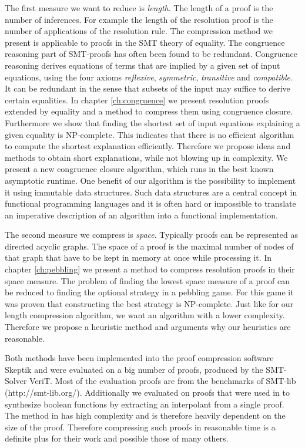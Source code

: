 The first measure we want to reduce is \emph{length}.
The length of a proof is the number of inferences.
For example the length of the resolution proof is the number of applications of the resolution rule.
The compression method we present is applicable to proofs in the SMT theory of equality.
The congruence reasoning part of SMT-proofs has often been found to be redundant.
Congruence reasoning derives equations of terms that are implied by a given set of input equations, 
using the four axioms \emph{reflexive}, \emph{symmetric}, \emph{transitive} and \emph{compatible}. 
It can be redundant in the sense that subsets of the input may suffice to derive certain equalities.
In chapter \ref{ch:congruence} we present resolution proofs extended by equality and a method to compress them using congruence closure.
Furthermore we show that finding the shortest set of input equations explaining a given equality is NP-complete.
This indicates that there is no efficient algorithm to compute the shortest explanation efficiently.
Therefore we propose ideas and methods to obtain short explanations, while not blowing up in complexity.
We present a new congruence closure algorithm, which runs in the best known asymptotic runtime.
One benefit of our algorithm is the possibility to implement it using immutable data structures.
Such data structures are a central concept in functional programming languages and it is often hard or impossible to translate an imperative description of an algorithm into a functional implementation.

The second measure we compress is \emph{space}.
Typically proofs can be represented as directed acyclic graphs.
The space of a proof is the maximal number of nodes of that graph that have to be kept in memory at once while processing it.
In chapter \ref{ch:pebbling} we present a method to compress resolution proofs in their space measure.
The problem of finding the lowest space measure of a proof can be reduced to finding the optional strategy in a pebbling game.
For this game it was proven that constructing the best strategy is NP-complete.
Just like for our length compression algorithm, we want an algorithm with a lower complexity.
Therefore we propose a heuristic method and arguments why our heuristics are reasonable.

Both methods have been implemented into the proof compression software Skeptik and were evaluated on a big number of proofs, produced by the SMT-Solver VeriT.
Most of the evaluation proofs are from the benchmarks of SMT-lib (http://smt-lib.org/).
Additionally we evaluated on proofs that were used in \cite{Hofferek2013} to synthesize boolean functions by extracting an interpolant from a single proof.
The method in \cite{Hofferek2013} has high complexity and is therefore heavily dependent on the size of the proof.
Therefore compressing such proofs in reasonable time is a definite plus for their work and possible those of many others.
